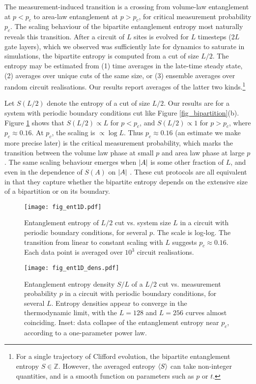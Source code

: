 \documentclass[10pt]{article}
\begin{document}
The measurement-induced transition is a crossing from volume-law entanglement at $p<p_c$ to area-law entanglement at $p>p_c$, for critical measurement probability $p_c$. The scaling behaviour of the bipartite entanglement entropy most naturally reveals this transition. After a circuit of $L$ sites is evolved for $L$ timesteps ($2L$ gate layers), which we observed was sufficiently late for dynamics to saturate in simulations, the bipartite entropy is computed from a cut of size $L/2$. The entropy may be estimated from (1) time averages in the late-time steady state, (2) averages over unique cuts of the same size, or (3) ensemble averages over random circuit realisations. Our results report averages of the latter two kinds.\footnote{For a single trajectory of Clifford evolution, the bipartite entanglement entropy $S \in \mathbb{Z}$. However, the averaged entropy $\ev{S}$ can take non-integer quantities, and is a smooth function on parameters such as $p$ or $t$.}

Let $S(L/2)$ denote the entropy of a cut of size $L/2$. Our results are for a system with periodic boundary conditions cut like Figure \ref{fig_bipartition}(b). Figure \ref{fig_1} shows that $S(L/2) \propto L$ for $p<p_c$, and $S(L/2)\propto 1$ for $p>p_c$, where $p_c \approx 0.16$. At $p_c$, the scaling is $\propto \log{L}$. Thus $p_c \approx 0.16$ (an estimate we make more precise later) is the critical measurement probability, which marks the transition between the volume law phase at small $p$ and area law phase at large $p$. The same scaling behaviour emerges when $\abs{A}$ is some other fraction of $L$, and even in the dependence of $S(A)$ on $\abs{A}$ \cite{li2018quantum}. These cut protocols are all equivalent in that they capture whether the bipartite entropy depends on the extensive size of a bipartition or on its boundary. 

\begin{figure}[t]
\centering
\texttt{[image: fig\_ent1D.pdf]}
\caption{Entanglement entropy of $L/2$ cut vs. system size $L$ in a circuit with periodic boundary conditions, for several $p$. The scale is log-log. The transition from linear to constant scaling with $L$ suggests $p_c \approx 0.16$. Each data point is averaged over $10^3$ circuit realisations.}
\label{fig_1}
\end{figure}

\begin{figure}[h]
\centering
\texttt{[image: fig\_ent1D\_dens.pdf]}
\caption{Entanglement entropy density $S/L$ of a $L/2$ cut vs. measurement probability $p$ in a circuit with periodic boundary conditions, for several $L$. Entropy densities appear to converge in the thermodynamic limit, with the $L=128$ and $L=256$ curves almost coinciding. Inset: data collapse of the entanglement entropy near $p_c$, according to a one-parameter power law.}
\label{fig_2}
\end{figure}
\end{document}
